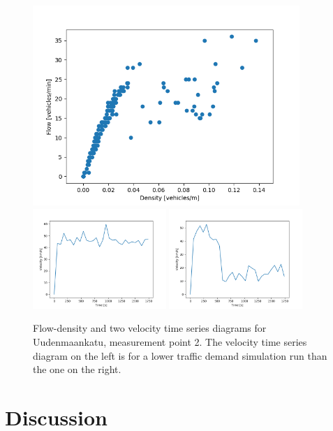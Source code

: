 \documentclass[english, 12pt, a4paper, elec, utf8, pdfa, online]{aaltothesis}
\begin{document}
\begin{figure}[ht!]
    \centering
    \includegraphics[width=0.9\textwidth]{graphs/Uudenmaankatu_2_flw_dns.png}
    \includegraphics[width=0.45\textwidth]{graphs/Uudenmaankatu_2_spd_time_4.png}
    \includegraphics[width=0.45\textwidth]{graphs/Uudenmaankatu_2_spd_time_5.png}
    \caption{Flow-density and two velocity time series diagrams for Uudenmaankatu, measurement point 2. The velocity time series diagram on the left is for a lower traffic demand simulation run than the one on the right.}
    \label{fig:4}
\end{figure}

\clearpage

\section{Discussion} \label{discussion}
\end{document}
